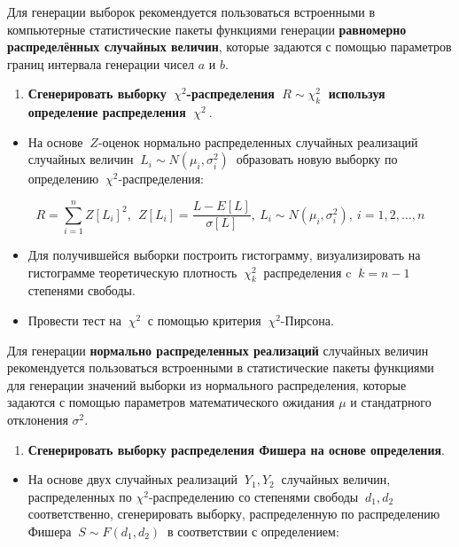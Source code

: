 \documentclass[
]{article}
\providecommand{\tightlist}{%
  \setlength{\itemsep}{0pt}\setlength{\parskip}{0pt}}
\begin{document}
Для генерации выборок рекомендуется пользоваться встроенными в
компьютерные статистические пакеты функциями генерации
\textbf{равномерно распределённых случайных величин}, которые задаются с
помощью параметров границ интервала генерации чисел \(a\) и \(b\).

\begin{enumerate}
\def\labelenumi{\arabic{enumi}.}
\setcounter{enumi}{1}
\tightlist
\item
  \textbf{Сгенерировать выборку \(\ \chi^2\)-распределения
  \(\ R \sim \chi_{k}^2\ \) используя определение распределения
  \(\ \chi^2\ \)}.
\end{enumerate}

\begin{itemize}
\tightlist
\item
  На основе \(\ Z\)-оценок нормально распределенных случайных реализаций
  случайных величин \(\ L_{i} \sim N(\mu_i, \sigma_i^2)\ \) образовать
  новую выборку по определению \(\ \chi^2\)-распределения:
\end{itemize}

\[
R = \sum_{i = 1}^{n} Z[L_i]^2,\ \ Z[L_i] = \frac{L - E[L]}{\sigma[L]}, \ L_i \sim N(\mu_i, \sigma_i^2),\ i = 1,2,\dots,n
\]

\begin{itemize}
\item
  Для получившейся выборки построить гистограмму, визуализировать на
  гистограмме теоретическую плотность \(\ \chi_k^2\ \) распределения c
  \(\ k = n-1\ \) степенями свободы.
\item
  Провести тест на \(\ \chi^2\ \) с помощью критерия
  \(\ \chi^2\)-Пирсона.
\end{itemize}

Для генерации \textbf{нормально распределенных реализаций} случайных
величин рекомендуется пользоваться встроенными в статистические пакеты
функциями для генерации значений выборки из нормального распределения,
которые задаются с помощью параметров математического ожидания \(\mu\) и
стандатрного отклонения \(\sigma^2\).

\begin{enumerate}
\def\labelenumi{\arabic{enumi}.}
\setcounter{enumi}{2}
\tightlist
\item
  \textbf{Сгенерировать выборку распределения Фишера на основе
  определения}.
\end{enumerate}

\begin{itemize}
\tightlist
\item
  На основе двух случайных реализаций \(\ Y_1, Y_2\ \) случайных
  величин, распределенных по \(\chi^2\)-распределению со степенями
  свободы \(\ d_1, d_2\ \) соответственно, сгенерировать выборку,
  распределенную по распределению Фишера \(\ S \sim F(d_1, d_2)\ \) в
  соответствии с определением:
\end{itemize}
\end{document}
